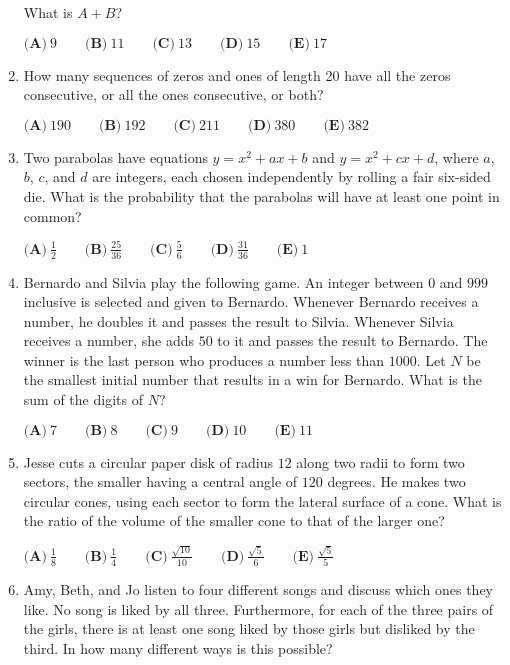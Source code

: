 \documentclass{article}
\begin{document}
\begin{enumerate}[label=\arabic*., itemsep=0.5em]
What is $A+B$?

$\textbf{(A)}\ 9\qquad\textbf{(B)}\ 11\qquad\textbf{(C)}\ 13\qquad\textbf{(D)}\ 15\qquad\textbf{(E)}\ 17 $\par \vspace{0.5em}\item How many sequences of zeros and ones of length 20 have all the zeros consecutive, or all the ones consecutive, or both?

$\textbf{(A)}\ 190\qquad\textbf{(B)}\ 192\qquad\textbf{(C)}\ 211\qquad\textbf{(D)}\ 380\qquad\textbf{(E)}\ 382 $\par \vspace{0.5em}\item Two parabolas have equations $y= x^2 + ax +b$ and $y= x^2 + cx +d$, where $a$, $b$, $c$, and $d$ are integers, each chosen independently by rolling a fair six-sided die. What is the probability that the parabolas will have at least one point in common?

$\textbf{(A)}\ \frac{1}{2}\qquad\textbf{(B)}\ \frac{25}{36}\qquad\textbf{(C)}\ \frac{5}{6}\qquad\textbf{(D)}\ \frac{31}{36}\qquad\textbf{(E)}\ 1 $\par \vspace{0.5em}\item Bernardo and Silvia play the following game. An integer between $0$ and $999$ inclusive is selected and given to Bernardo. Whenever Bernardo receives a number, he doubles it and passes the result to Silvia. Whenever Silvia receives a number, she adds $50$ to it and passes the result to Bernardo. The winner is the last person who produces a number less than $1000$. Let $N$ be the smallest initial number that results in a win for Bernardo. What is the sum of the digits of $N$?

$ \textbf{(A)}\ 7\qquad\textbf{(B)}\ 8\qquad\textbf{(C)}\ 9\qquad\textbf{(D)}\ 10\qquad\textbf{(E)}\ 11 $\par \vspace{0.5em}\item Jesse cuts a circular paper disk of radius $12$ along two radii to form two sectors, the smaller having a central angle of $120$ degrees. He makes two circular cones, using each sector to form the lateral surface of a cone. What is the ratio of the volume of the smaller cone to that of the larger one?

$\textbf{(A)}\ \frac{1}{8}\qquad\textbf{(B)}\ \frac{1}{4}\qquad\textbf{(C)}\ \frac{\sqrt{10}}{10}\qquad\textbf{(D)}\ \frac{\sqrt{5}}{6}\qquad\textbf{(E)}\ \frac{\sqrt{5}}{5}$\par \vspace{0.5em}\item Amy, Beth, and Jo listen to four different songs and discuss which ones they like. No song is liked by all three. Furthermore, for each of the three pairs of the girls, there is at least one song liked by those girls but disliked by the third. In how many different ways is this possible?


\end{enumerate}
\end{document}
